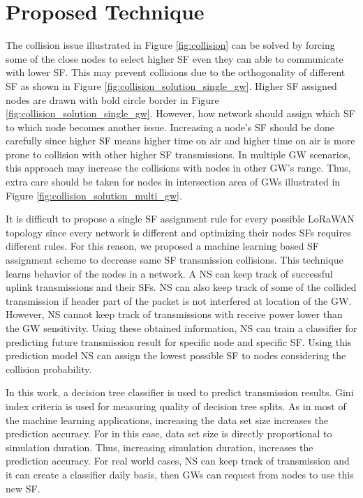\documentclass[conference]{IEEEtran}
\begin{document}
\section{Proposed Technique} \label{Proposed Technique}
\par The collision issue illustrated in Figure \ref{fig:collision} can be solved by forcing some of the close nodes to select higher SF even they can able to communicate with lower SF. This may prevent collisions due to the orthogonality of different SF as shown in Figure \ref{fig:collision_solution_single_gw}. Higher SF assigned nodes are drawn with bold circle border in Figure \ref{fig:collision_solution_single_gw}. However, how network should assign which SF to which node becomes another issue. Increasing a node's SF should be done carefully since higher SF means higher time on air and higher time on air is more prone to collision with other higher SF transmissions. In multiple GW scenarios, this approach may increase the collisions with nodes in other GW's range. Thus, extra care should be taken for nodes in intersection area of GWs illustrated in Figure \ref{fig:collision_solution_multi_gw}.

\par It is difficult to propose a single SF assignment rule for every possible LoRaWAN topology since every network is different and optimizing their nodes SFs requires different rules. For this reason, we proposed a machine learning based SF assignment scheme to decrease same SF transmission collisions. This technique learns behavior of the nodes in a network. A NS can keep track of successful uplink transmissions and their SFs. NS can also keep track of some of the collided transmission if header part of the packet is not interfered at location of the GW. However, NS cannot keep track of transmissions with receive power lower than the GW sensitivity. Using these obtained information, NS can train a classifier for predicting future transmission result for specific node and specific SF. Using this prediction model NS can assign the lowest possible SF to nodes considering the collision probability.

\par In this work, a decision tree classifier is used to predict transmission results. Gini index criteria is used for measuring quality of decision tree splits. As in most of the machine learning applications, increasing the data set size increases the prediction accuracy. For in this case, data set size is directly proportional to simulation duration. Thus, increasing simulation duration, increases the prediction accuracy. For real world cases, NS can keep track of transmission and it can create a classifier daily basis, then GWs can request from nodes to use this new SF.
\end{document}
